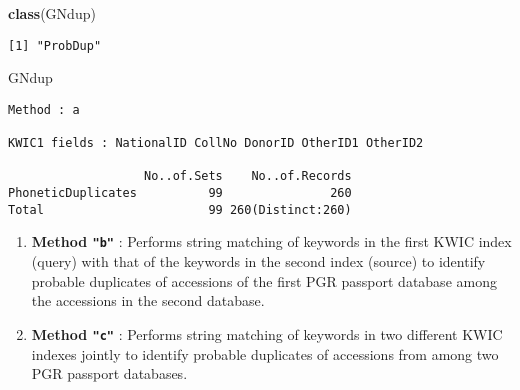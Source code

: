 \documentclass[
]{article}
\newenvironment{Shaded}{\begin{snugshade}}{\end{snugshade}}
\newcommand{\KeywordTok}[1]{\textcolor[rgb]{0.13,0.29,0.53}{\textbf{#1}}}
\newcommand{\NormalTok}[1]{#1}
\begin{document}
\begin{Shaded}
\begin{Highlighting}[]
\KeywordTok{class}\NormalTok{(GNdup)}
\end{Highlighting}
\end{Shaded}

\begin{verbatim}
[1] "ProbDup"
\end{verbatim}

\begin{Shaded}
\begin{Highlighting}[]
\NormalTok{GNdup}
\end{Highlighting}
\end{Shaded}

\begin{verbatim}
Method : a

KWIC1 fields : NationalID CollNo DonorID OtherID1 OtherID2
 
                   No..of.Sets    No..of.Records
PhoneticDuplicates          99               260
Total                       99 260(Distinct:260)
\end{verbatim}

\begin{enumerate}
\def\labelenumi{\arabic{enumi}.}
\setcounter{enumi}{1}
\item
  \textbf{Method \texttt{"b"}} : Performs string matching of keywords in
  the first KWIC index (query) with that of the keywords in the second
  index (source) to identify probable duplicates of accessions of the
  first PGR passport database among the accessions in the second
  database.
\item
  \textbf{Method \texttt{"c"}} : Performs string matching of keywords in
  two different KWIC indexes jointly to identify probable duplicates of
  accessions from among two PGR passport databases.
\end{enumerate}
\end{document}
